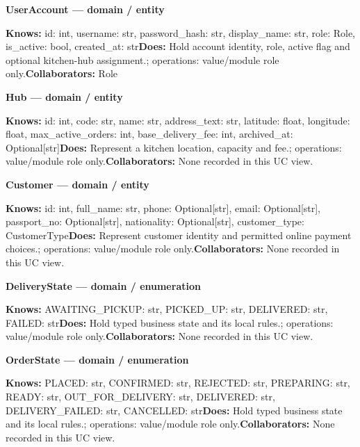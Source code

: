 \textbf{UserAccount --- domain / \guillemotleft{}entity\guillemotright{}}

\textbf{Knows:} id: int, username: str, password\_hash: str, display\_name: str, role: Role, is\_active: bool, created\_at: str\newline{}\textbf{Does:} Hold account identity, role, active flag and optional kitchen-hub assignment.; operations: value/module role only.\newline{}\textbf{Collaborators:} Role

\textbf{Hub --- domain / \guillemotleft{}entity\guillemotright{}}

\textbf{Knows:} id: int, code: str, name: str, address\_text: str, latitude: float, longitude: float, max\_active\_orders: int, base\_delivery\_fee: int, archived\_at: Optional[str]\newline{}\textbf{Does:} Represent a kitchen location, capacity and fee.; operations: value/module role only.\newline{}\textbf{Collaborators:} None recorded in this UC view.

\textbf{Customer --- domain / \guillemotleft{}entity\guillemotright{}}

\textbf{Knows:} id: int, full\_name: str, phone: Optional[str], email: Optional[str], passport\_no: Optional[str], nationality: Optional[str], customer\_type: CustomerType\newline{}\textbf{Does:} Represent customer identity and permitted online payment choices.; operations: value/module role only.\newline{}\textbf{Collaborators:} None recorded in this UC view.

\textbf{DeliveryState --- domain / \guillemotleft{}enumeration\guillemotright{}}

\textbf{Knows:} AWAITING\_PICKUP: str, PICKED\_UP: str, DELIVERED: str, FAILED: str\newline{}\textbf{Does:} Hold typed business state and its local rules.; operations: value/module role only.\newline{}\textbf{Collaborators:} None recorded in this UC view.

\textbf{OrderState --- domain / \guillemotleft{}enumeration\guillemotright{}}

\textbf{Knows:} PLACED: str, CONFIRMED: str, REJECTED: str, PREPARING: str, READY: str, OUT\_FOR\_DELIVERY: str, DELIVERED: str, DELIVERY\_FAILED: str, CANCELLED: str\newline{}\textbf{Does:} Hold typed business state and its local rules.; operations: value/module role only.\newline{}\textbf{Collaborators:} None recorded in this UC view.

